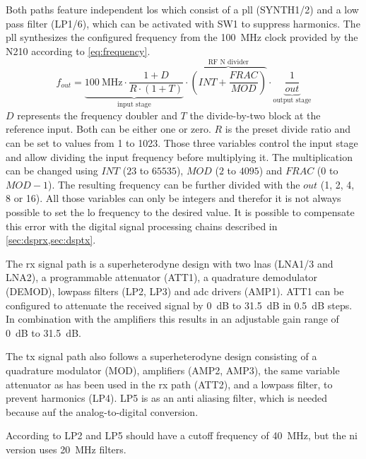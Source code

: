 \documentclass[12pt,a4paper,parskip=full]{scrartcl}
\begin{document}
Both paths feature independent \glspl{lo} which consist of a \gls{pll} (SYNTH1/2) and a low
pass filter (LP1/6), which can be activated with SW1 to suppress harmonics\cite{flo}. The
\gls{pll} synthesizes the configured frequency from the \SI{100}{\mega\hertz} clock provided
by the N210 according to \cref{eq:frequency}\cite{synth}.
\begin{equation}
\label{eq:frequency}
f_{out} = \underbrace{\SI{100}{\mega\hertz} \cdot \frac{1 + D}{R \cdot (1 + T)}}_\text{input stage} \cdot \overbrace{\left(INT + \frac{FRAC}{MOD}\right)}^\text{RF N divider} \cdot \underbrace{\frac{1}{out}}_\text{output stage}
\end{equation}
$D$ represents the frequency doubler and $T$ the divide-by-two block at the reference input. Both can
be either one or zero. $R$ is the preset divide ratio and can be set to values from 1 to 1023.
Those three variables control the input stage and allow dividing the input frequency before multiplying
it. The multiplication can be changed using $INT$ ($23$ to $65535$), $MOD$ ($2$ to $4095$)
and $FRAC$ (0 to $MOD - 1$). The resulting frequency can be further divided with the $out$ (1, 2, 4, 8 or 16).
All those variables can only be integers and therefor it is not always possible to set the \gls{lo}
frequency to the desired value. It is possible to compensate this error with the digital signal
processing chains described in \cref{sec:dsprx,sec:dsptx}.

The \gls{rx} signal path is a superheterodyne design with two \glspl{lna} (LNA1/3 and LNA2),
a programmable attenuator (ATT1), a quadrature demodulator (DEMOD), lowpass filters (LP2, LP3)
and \gls{adc} drivers (AMP1). ATT1 can be configured to attenuate the received signal by
\SI{0}{\deci\bel} to \SI{31.5}{\deci\bel} in \SI{0.5}{\deci\bel} steps. In combination with
the amplifiers this results in an adjustable gain range of \SI{0}{\deci\bel} to \SI{31.5}{\deci\bel}.

The \gls{tx} signal path also follows a superheterodyne design consisting of a quadrature
modulator (MOD), amplifiers (AMP2, AMP3), the same variable attenuator as has been used in
the \gls{rx} path (ATT2), and a lowpass filter, to prevent harmonics (LP4). LP5 is as an
anti aliasing filter, which is needed because auf the analog-to-digital conversion.

According to \cite{sch_sbx} LP2 and LP5 should have a cutoff frequency of \SI{40}{\mega\hertz},
but the \gls{ni} version uses \SI{20}{\mega\hertz} filters\cite{ni_29xx}.
\end{document}
